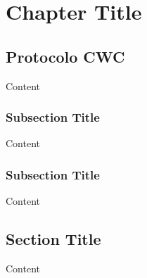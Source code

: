 
\chapter{Chapter Title} %

\label{ch:name} %


\section{Protocolo CWC}
\label{sec:protocolo_cwc}

Content


\subsection{Subsection Title}

Content


\subsection{Subsection Title}

Content


\section{Section Title}

Content